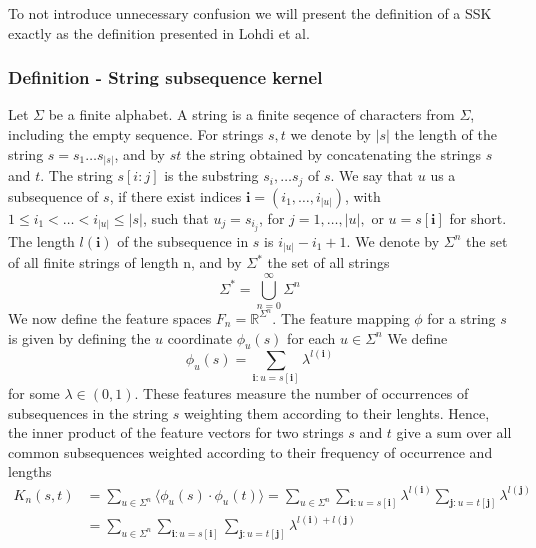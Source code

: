 To not introduce unnecessary confusion we will present the definition of a SSK exactly as the definition presented in Lohdi et al. 

\subsubsection{Definition - String subsequence kernel}
Let $ \Sigma $ be a finite alphabet. A string is a finite seqence of characters from $ \Sigma $, including the empty sequence. For strings $s,t$ we denote by $|s|$ the length of the string $ s = s_1 \dots s_{|s|} $, and by $ st $ the string obtained by concatenating the strings $ s $ and $ t $. The string $ s[i:j] $ is the substring $ s_i, \dots s_j $ of $ s $. We say that $ u $ us a subsequence of $ s $, if there exist indices $ \boldsymbol{i} = (i_1, \dots, i_{|u|}) $, with $ 1 \leq i_1 < \dots < i_{|u|} \leq |s| $, such that $ u_j = s_{i_{j}}$, for $ j = 1, \dots, |u|, $ or $ u = s[\boldsymbol{i}] $ for short. The length $ l(\boldsymbol{i}) $ of the subsequence in $ s $ is $ i_{|u|} - i_1 +1 $. We denote by $ \Sigma^n $ the set of all finite strings of length n, and by $ \Sigma^* $ the set of all strings 
\begin{equation}\label{eq:all_Strings}
\Sigma^* = \bigcup^{\infty}_{n=0}\Sigma^n
\end{equation}
We now define the feature spaces $ F_n = \mathbb{R}^{\Sigma^{n}} $. The feature mapping $ \phi $ for a string $ s $ is given by defining the $ u $ coordinate $ \phi_u(s) $ for each $u \in \Sigma^n  $ We define 
\begin{equation}
\phi_u(s) = \sum_{\boldsymbol{i}:u=s[\boldsymbol{i}]} \lambda^{l(\boldsymbol{i})}
\end{equation}
for some $ \lambda \in (0,1) $. These features measure the number of occurrences of subsequences in the string $ s $ weighting them according to their lenghts. Hence, the inner product of the feature vectors for two strings $ s $ and $ t $ give a sum over all common subsequences weighted according to their frequency of occurrence and lengths
\begin{align*}\label{key}
K_n(s,t) &= \sum_{u\in\Sigma^n} \langle \phi_u(s) \cdot \phi_u(t) \rangle = \sum_{u \in \Sigma^n} \sum_{\boldsymbol{i}:u=s[\boldsymbol{i}]} \lambda^{l(\boldsymbol{i})} \sum_{\boldsymbol{j}:u=t[\boldsymbol{j}]} \lambda^{l(\boldsymbol{j})} \\
& =  \sum_{u \in \Sigma^n} \sum_{\boldsymbol{i}:u=s[\boldsymbol{i}]}  \sum_{\boldsymbol{j}:u=t[\boldsymbol{j}]} \lambda^{l(\boldsymbol{i}) + l(\boldsymbol{j})}
\end{align*}


